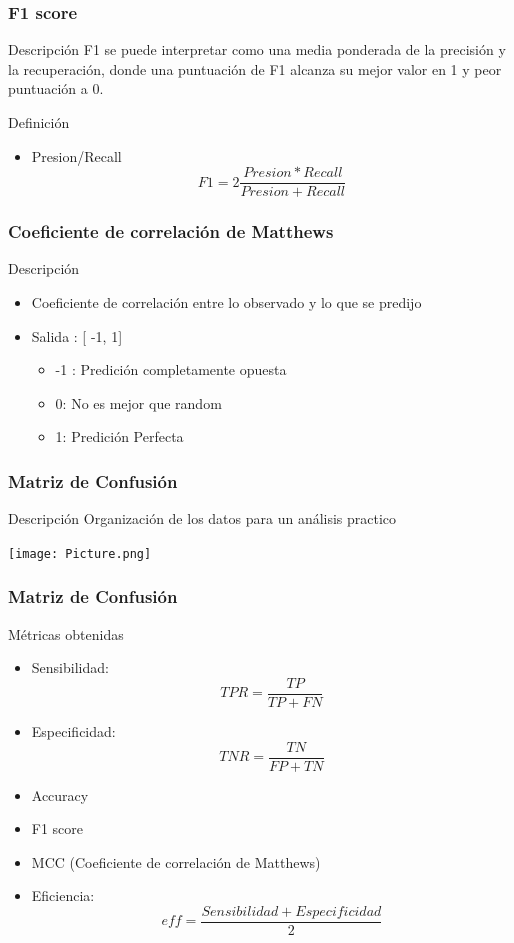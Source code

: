 \documentclass{beamer}
\begin{document}
\begin{frame}
  \frametitle{F1 score}
	\begin{block}{Descripci\'on}
	 F1 se puede interpretar como una media ponderada de la precisi\'on y la recuperaci\'on, donde una 			puntuaci\'on de F1 alcanza su mejor valor en 1 y peor puntuación a 0.
	\end{block}
  \begin{block}{Definici\'on}
  	\begin{itemize}
  	\item Presion/Recall
  	\[F1= 2 \dfrac{Presion*Recall}{Presion+Recall} \]   
  	\end{itemize}
  \end{block}
\end{frame}
\begin{frame} 
 \frametitle{Coeficiente de correlaci\'on de Matthews}

  \begin{block}{Descripci\'on}
  \begin{itemize}
  	\item Coeficiente de correlaci\'on entre lo observado y lo que se predijo
  	\item Salida : [ -1, 1] 
	\begin{itemize}
	\item -1 : Predici\'on completamente opuesta
	\item 0: No es mejor que random
	\item 1: Predici\'on Perfecta
\end{itemize}	  	
  \end{itemize}
  \end{block}
\end{frame}


\begin{frame}
  \frametitle{Matriz de Confusi\'on}

  \begin{block}{Descripci\'on}
  	Organizaci\'on de los datos para un an\'alisis practico  
 
  \end{block}
  \texttt{[image: Picture.png]} 
  \end{frame}
  \begin{frame}
\frametitle{Matriz de Confusi\'on}
  
  \begin{block}{M\'etricas obtenidas}
  \begin{itemize}
  	\item Sensibilidad: \[TPR=  \dfrac{TP}{TP+FN} \]   
  	\item Especificidad: \[TNR=  \dfrac{TN}{FP+TN} \]  
  	\item Accuracy
  	\item F1 score
  	\item MCC (Coeficiente de correlaci\'on de Matthews)
	\item Eficiencia: \[eff = \dfrac {Sensibilidad + Especificidad}{2}\]
    \end{itemize}
  
  \end{block}
\end{frame}
\end{document}

